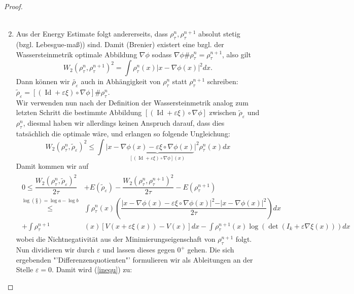 \documentclass[11pt,a4paper,notitlepage]{scrreprt}
\begin{document}
\begin{proof}
\begin{enumerate}
\begin{align}
\end{align}
\item Aus der Energy Estimate folgt andererseits, dass $\rho_\tau^n, \rho_\tau^{n+1}$ absolut stetig (bzgl. Lebesgue-maß)) sind. Damit (Brenier) existert eine bzgl. der Wassersteinmetrik optimale Abbildung $\nabla \phi$ sodass $\nabla \phi \# \rho_\tau^n=\rho_\tau^{n+1}$, also gilt
\begin{equation}
W_2(\rho_\tau^n,\rho_\tau^{n+1})^2=\int \rho_\tau^n(x)\vert x-\nabla\phi(x)\vert^2 dx.
\end{equation}
Dann können wir $\tilde{\rho_\varepsilon}$ auch in Abhängigkeit von $\rho_\tau^n$ statt $\rho_\tau^{n+1}$ schreiben: $\tilde{\rho}_\varepsilon=[(\operatorname{Id}+\varepsilon\xi)\circ\nabla\phi]\#\rho_\tau^n$.\\
Wir verwenden nun nach der Definition der Wassersteinmetrik analog zum letzten Schritt die bestimmte Abbildung $[(\operatorname{Id}+\varepsilon\xi)\circ\nabla\phi]$ zwischen $\tilde{\rho}_\varepsilon$ und $\rho_\tau^n$, diesmal haben wir allerdings keinen Anspruch darauf, dass dies tatsächlich die optimale wäre, und erlangen so folgende Ungleichung:
\begin{equation*}
W_2(\rho_\tau^n,\tilde{\rho}_\varepsilon)^2 \leq \int \vert x-\underset{[(\operatorname{Id}+\varepsilon\xi)\circ\nabla\phi](x)}{\underbrace{\nabla \phi(x)-\varepsilon\xi\circ\nabla\phi(x)}}\vert^2 \rho_\tau^n(x)dx
\end{equation*}
Damit kommen wir auf
\begin{align}
\begin{split}
0\leq\dfrac{W_2(\rho_\tau^n,\tilde{\rho}_\varepsilon)^2}{2\tau}&+E(\tilde{\rho}_\varepsilon)-\dfrac{W_2(\rho_\tau^n,\rho_\tau^{n+1})^2}{2\tau}-E(\rho_\tau^{n+1})\\
\overset{\log(\frac{a}{b})=\log a-\log b}\leq&\int\rho_\tau^n(x)\left(\dfrac{\vert x-\nabla \phi(x)-\varepsilon\xi\circ\nabla\phi(x)\vert^2-\vert x-\nabla\phi(x)\vert^2}{2\tau}\right)dx\\
+\int\rho_\tau^{n+1}&(x)[V(x+\varepsilon\xi(x))-V(x)]dx-\int\rho_\tau^{n+1}(x)\log( \det(I_k+\varepsilon\nabla\xi(x)))dx \label{inequ}
\end{split}
\end{align}
wobei die Nichtnegativität aus der Minimierungseigenschaft von $\rho_\tau^{n+1}$ folgt.\\
Nun dividieren wir durch $\varepsilon$ und lassen dieses gegen $0^+$ gehen. Die sich ergebenden "'Differenzenquotienten"' formulieren wir als Ableitungen an der Stelle $\varepsilon=0$. Damit wird (\ref{inequ}) zu: 

\end{enumerate}
\end{proof}
\end{document}
